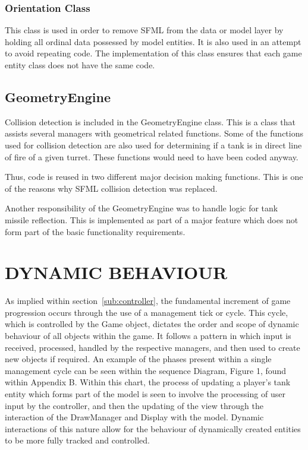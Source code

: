 \documentclass[10pt,twocolumn]{witseiepaper}
\begin{document}
\subsubsection{Orientation Class}
This class is used in order to remove SFML from the data or model layer by holding all ordinal data possessed by model entities. It is also used in an attempt to avoid repeating code. The implementation of this class ensures that each game entity class does not have the same code.

\subsection{GeometryEngine}
\label{sub:geometry}
Collision detection is included in the GeometryEngine class. This is a class that assists several managers with geometrical related functions. Some of the functions used for collision detection are also used for determining if a tank is in direct line of fire of a given turret. These functions would need to have been coded anyway. 

Thus, code is reused in two different major decision making functions. This is one of the reasons why SFML collision detection was replaced. 

Another responsibility of the GeometryEngine was to handle logic for tank missile reflection. This is implemented as part of a major feature which does not form part of the basic functionality requirements.





\section{DYNAMIC BEHAVIOUR} 

As implied within section~\ref{sub:controller}, the fundamental increment of game progression occurs through the use of a management tick or cycle. This cycle, which is controlled by the Game object, dictates the order and scope of dynamic behaviour of all objects within the game. It follows a pattern in which input is received, processed, handled by the respective managers, and then used to create new objects if required. An example of the phases present within a single management cycle can be seen within the sequence Diagram, Figure 1, found within Appendix B. Within this chart, the process of updating a player's tank entity which forms part of the model is seen to involve the processing of user input by the controller, and then the updating of the view through the interaction of the DrawManager and Display with the model. Dynamic interactions of this nature allow for the behaviour of dynamically created entities to be more fully tracked and controlled.  
\end{document}
